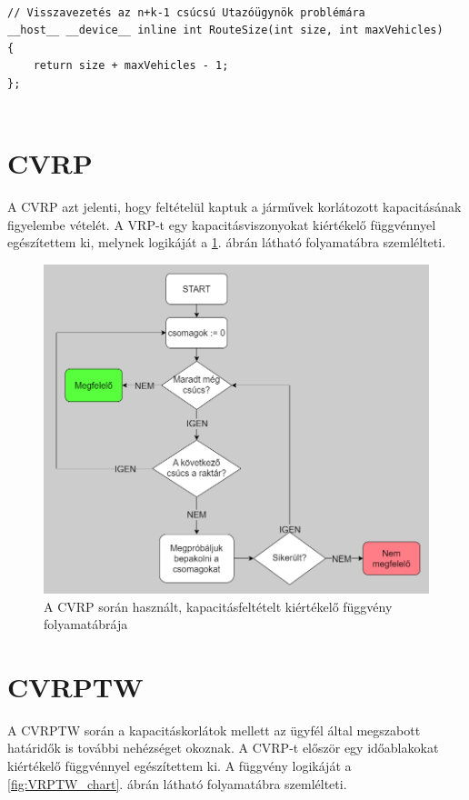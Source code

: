 \begin{lstlisting}[style=CStyle,showstringspaces=false]
	
// Visszavezetés az n+k-1 csúcsú Utazóügynök problémára
__host__ __device__ inline int RouteSize(int size, int maxVehicles)
{
	return size + maxVehicles - 1;
};	
	
\end{lstlisting} 

\section{CVRP}

A CVRP azt jelenti, hogy feltételül kaptuk a járművek korlátozott kapacitásának figyelembe vételét. A VRP-t egy kapacitásviszonyokat kiértékelő függvénnyel egészítettem ki, melynek logikáját a \ref{fig:CVRP_chart}. ábrán látható folyamatábra szemlélteti.

\begin{figure}[ht!]
	\centering
	\includegraphics[width=150mm, keepaspectratio]{figures/Capacity.drawio.png}
	\caption{A CVRP során használt, kapacitásfeltételt kiértékelő függvény folyamatábrája}
	\label{fig:CVRP_chart}
\end{figure}

\section{CVRPTW}

A CVRPTW során a kapacitáskorlátok mellett az ügyfél által megszabott határidők is további nehézséget okoznak. A CVRP-t először egy időablakokat kiértékelő függvénnyel egészítettem ki. A függvény logikáját a \ref{fig:VRPTW_chart}. ábrán látható folyamatábra szemlélteti.

